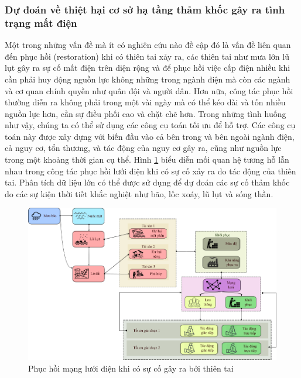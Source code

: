 \documentclass[utf8]{frontiersSCNS} %
\begin{document}
\subsubsection{Dự đoán về thiệt hại cơ sở hạ tầng thảm khốc gây ra tình trạng mất điện}


Một trong những vấn đề mà ít có nghiên cứu nào đề cập đó là vấn đề liên quan đến phục hồi (restoration) khi có thiên tai xảy ra, các thiên tai như mưa lớn lũ lụt gây ra sự cố mất điện trên diện rộng và để phục hồi việc cấp điện nhiều khi cần phải huy động nguồn lực không những trong ngành điện mà còn các ngành và cơ quan chính quyền như quân đội và người dân. Hơn nữa, công tác phục hồi thường diễn ra không phải trong một vài ngày mà có thể kéo dài và tốn nhiều nguồn lực hơn, cần sự điều phối cao và chặt chẽ hơn. Trong những tình huống như vậy, chúng ta có thể sử dụng các công cụ toán tối ưu để hỗ trợ. Các công cụ toán này được xây dựng với biến đầu vào cả bên trong và bên ngoài ngành điện, cả nguy cơ, tổn thương, và tác động của nguy cơ gây ra, cũng như nguồn lực trong một khoảng thời gian cụ thể. Hình \ref{fig:restoration} biểu diễn mối quan hệ tương hỗ lẫn nhau trong công tác phục hồi lưới điện khi có sự cố xảy ra do tác động của thiên tai. Phân tích dữ liệu lớn có thể được sử dụng để dự đoán các sự cố thảm khốc do các sự kiện thời tiết khắc nghiệt như bão, lốc xoáy, lũ lụt và sóng thần.

\FloatBarrier
\begin{figure}[h]
	\centering
	\begin{center}
		\includegraphics[width=14cm]{restoration}%
	\end{center}
	\caption{Phục hồi mạng lưới điện khi có sự cố gây ra bởi thiên tai}\label{fig:restoration}
\end{figure}
\FloatBarrier
\end{document}
